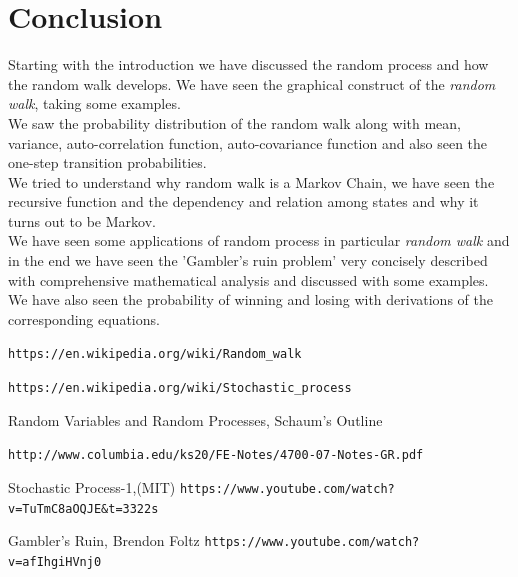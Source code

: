 \documentclass[12pt,a4paper]{article}%
\begin{document}
 	\section{Conclusion}
 	\begin{flushleft}
 		\fontsize{12pt}{18pt}\selectfont
 		Starting with the introduction we have discussed the random process and how the random walk develops. We have seen the graphical construct of the \textit{random walk}, taking some examples.\\\smallskip
 		We saw the probability distribution of the random walk along with mean, variance, auto-correlation function, auto-covariance function and also seen the one-step transition probabilities.\\\smallskip
 		We tried to understand why random walk is a Markov Chain, we have seen the recursive function and the dependency and relation among states and why it turns out to be Markov.\\\smallskip
 		We have seen some applications of random process in particular \textit{random walk} and in the end we have seen the 'Gambler's ruin problem' very concisely described with comprehensive mathematical analysis and discussed with some examples. We have also seen the probability of winning and losing with derivations of the corresponding equations.
 	\pagebreak
 \end{flushleft}
 	\begin{thebibliography}{9}
 		\texttt{https://en.wikipedia.org/wiki/Random\_walk}
 		
 		\texttt{https://en.wikipedia.org/wiki/Stochastic\_process}
 		
 		Random Variables and Random Processes, Schaum's Outline
 		
 		\texttt{http://www.columbia.edu/\texttildelow ks20/FE-Notes/4700-07-Notes-GR.pdf}
 		
 		Stochastic Process-1,(MIT)
 		\texttt{https://www.youtube.com/watch?v=TuTmC8aOQJE\&t=3322s}
 		
 		Gambler's Ruin, Brendon Foltz
 		\texttt{https://www.youtube.com/watch?v=afIhgiHVnj0}
 	\end{thebibliography}
 	
\end{document}
